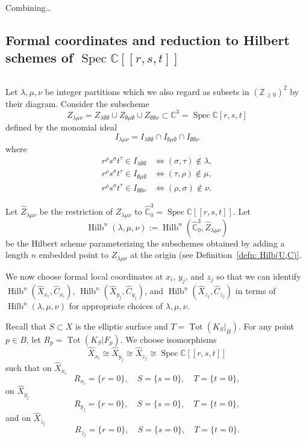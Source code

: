 \documentclass{amsart}
\theoremstyle{definition}
\newcommand{\CC} {\mathbb{C}}          %
\newcommand{\ZZ} {\mathbb{Z}}		%
\newcommand{\Hilb}{\operatorname{Hilb}}
\newcommand{\Tot}{\operatorname{Tot}}
\newcommand{\Spec}{\operatorname{Spec}}
\renewcommand{\hat}{\widehat}
\newcommand{\Xhat}{\widehat{X}}
\begin{document}
Combining\dots 


\subsection{Formal coordinates and reduction to Hilbert schemes
of $\Spec \CC [[r,s,t]]$}\label{subsec: Formal coordinates and
reduction to Hilbert scheme on C3}$\quad $

\smallskip

Let $\lambda ,\mu ,\nu$ be integer partitions which we also regard as
subsets in $(\ZZ_{\geq 0})^{2}$ by their diagram. Consider the
subscheme 
\[
Z_{\lambda \mu \nu}=Z_{\lambda \emptyset \emptyset}\cup
Z_{\emptyset \mu \emptyset}\cup Z_{\emptyset \emptyset \nu } \subset
\CC^{3}=\Spec \CC [r,s,t]
\]
defined by the monomial ideal
\[
I_{\lambda \mu \nu} = I_{\lambda \emptyset \emptyset}\cap I_{\emptyset \mu \emptyset}\cap I_{\emptyset \emptyset \nu}
\]
where 
\begin{align*}
r^{\rho}s^{\sigma}t^{\tau}\in I_{\lambda \emptyset \emptyset} & \iff
(\sigma ,\tau )\notin \lambda ,\\
r^{\rho}s^{\sigma}t^{\tau}\in I_{\emptyset \mu  \emptyset} & \iff
(\tau,\rho  )\notin \mu ,\\
r^{\rho}s^{\sigma}t^{\tau}\in I_{\emptyset \emptyset \nu } & \iff
(\rho ,\sigma  )\notin \nu . 
\end{align*}

Let $\hat{Z}_{\lambda \mu \nu}$ be the restriction of $Z_{\lambda \mu
\nu}$ to $\hat{\CC}^{3}_{0} = \Spec \CC [[r,s,t]]$. Let
\[
\Hilb^{n}(\lambda ,\mu ,\nu) := \Hilb^{n}(\hat{\CC}^{3}_{0}, \hat{Z}_{\lambda \mu \nu} )
\]
be the Hilbert scheme parameterizing the subschemes obtained by adding
a length $n$ embedded point to $Z_{\lambda \mu \nu}$ at the origin
(see Definition~\ref{defn: Hilb(U,C)}.

We now choose formal local coordinates at $x_{i}$, $y_{j}$, and
$z_{j}$ so that we can identify
$\Hilb^{n}(\Xhat_{x_{i}},\hat{C}_{x_{i}})$,
$\Hilb^{n}(\Xhat_{y_{j}},\hat{C}_{y_{j}})$, and
$\Hilb^{n}(\Xhat_{z_{j}},\hat{C}_{z_{j}})$ in terms of
$\Hilb^{n}(\lambda ,\mu ,\nu )$ for appropriate choices of $\lambda
,\mu ,\nu$. 


Recall that $S\subset X$ is the elliptic surface and $T=\Tot
(K_{S}|_{B}).$ For any point $p\in B$, let $R_{p} =\Tot
(K_{S}|F_{p})$. We choose isomorphisms 
\[
\Xhat_{x_{i}} \cong \Xhat_{y_{j}} \cong \Xhat_{z_{j}} \cong \Spec \CC [[r,s,t]]
\]
such that on $\Xhat_{x_{i}}$ 
\[
R_{x_{i}} = \{r=0 \},\quad S=\{s=0 \}, \quad T=\{t=0 \},
\]
on $\Xhat_{y_{j}}$ 
\[
R_{y_{j}} = \{r=0 \},\quad S=\{s=0 \}, \quad T=\{t=0 \},
\]
and on $\Xhat_{z_{j}}$ 
\[
R_{z_{j}} = \{r=0 \},\quad S=\{s=0 \}, \quad T=\{t=0 \}.
\]
\end{document}
